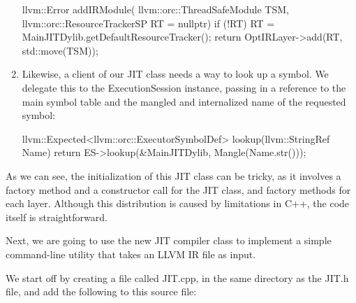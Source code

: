 \begin{enumerate}
\begin{cpp}
    llvm::Error addIRModule(
            llvm::orc::ThreadSafeModule TSM,
            llvm::orc::ResourceTrackerSP RT = nullptr) {
        if (!RT)
            RT = MainJITDylib.getDefaultResourceTracker();
        return OptIRLayer->add(RT, std::move(TSM));
    }
\end{cpp}

\item
Likewise, a client of our JIT class needs a way to look up a symbol. We delegate this to the ExecutionSession instance, passing in a reference to the main symbol table and the mangled and internalized name of the requested symbol:

\begin{cpp}
    llvm::Expected<llvm::orc::ExecutorSymbolDef>
    lookup(llvm::StringRef Name) {
        return ES->lookup({&MainJITDylib},
                            Mangle(Name.str()));
    }
\end{cpp}
\end{enumerate}

As we can see, the initialization of this JIT class can be tricky, as it involves a factory method and a constructor call for the JIT class, and factory methods for each layer. Although this distribution is caused by limitations in C++, the code itself is straightforward.

Next, we are going to use the new JIT compiler class to implement a simple command-line utility that takes an LLVM IR file as input.


We start off by creating a file called JIT.cpp, in the same directory as the JIT.h file, and add the following to this source file:

